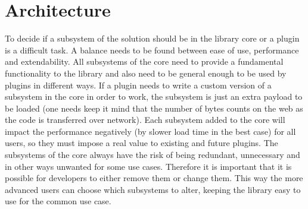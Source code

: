 \documentclass[a4paper,11pt]{kth-mag}
\begin{document}
    \section{Architecture}\label{sec:arcithecture}
      To decide if a subsystem of the solution should be in the library core or a plugin is a difficult task.
      A balance needs to be found between ease of use, performance and extendability.
      All subsystems of the core need to provide a fundamental functionality to the library and also need to be general enough to be used by plugins in different ways.
      If a plugin needs to write a custom version of a subsystem in the core in order to work, the subsystem is just an extra payload to be loaded (one needs keep it mind that the number of bytes counts on the web as the code is transferred over network).
      Each subsystem added to the core will impact the performance negatively (by slower load time in the best case) for all users, so they must impose a real value to existing and future plugins.
      The subsystems of the core always have the risk of being redundant, unnecessary and in other ways unwanted for some use cases.
      Therefore it is important that it is possible for developers to either remove them or change them.
      This way the more advanced users can choose which subsystems to alter, keeping the library easy to use for the common use case.

      
\end{document}

